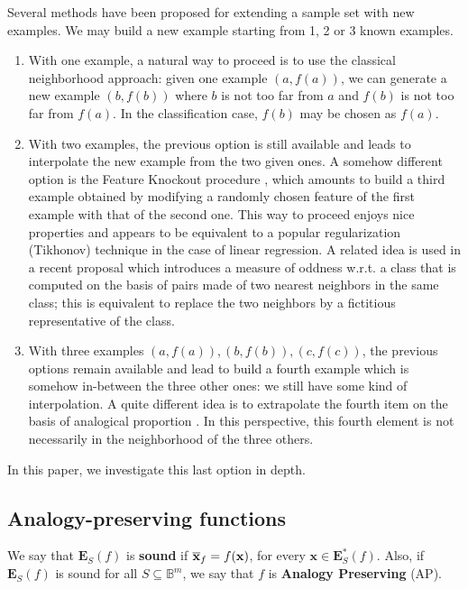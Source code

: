 Several methods have been proposed for extending a sample set with new
examples. We may build a new example starting from
1, 2 or 3 known examples.
\begin{enumerate}
\item With one example, a natural way to proceed is to use the classical
  neighborhood approach: given one  example $(a,f(a))$, we can generate a new
    example $(b,f(b))$ where  $b$ is not too far from $a$ and $f(b)$ is not too
    far from $f(a)$. In the classification case, $f(b)$ may be chosen as
    $f(a)$.
\item With two examples, the previous option is still available and leads to
  interpolate the new example from the two given ones.  A somehow different
    option is the Feature Knockout procedure \cite{WolMar2004}, which amounts
    to build a third example obtained by modifying a randomly chosen feature
    of the first example with that of the second one.  This way to
    proceed enjoys nice properties and appears to be equivalent to a popular
    regularization (Tikhonov) technique in the case of linear regression.  A
    related idea is used in a recent proposal \cite{BouPraRicECAI2016} which
    introduces a measure of oddness w.r.t. a class that is computed on the
    basis of pairs made of two nearest neighbors in the same class; this is
    equivalent to replace the two neighbors by a fictitious representative of
    the class.

\item With three examples $(a,f(a)), (b,f(b)), (c,f(c))$, the previous options
  remain available and lead to build a fourth example which is somehow
    in-between the three other ones: we still have some kind of interpolation.
    A quite different idea is to extrapolate the fourth item on the basis of
    analogical proportion \cite{BayMouMicAnqECML2007}.  In this perspective,
    this fourth element is not necessarily in the neighborhood of the three
    others.
\end{enumerate}
In this paper, we investigate this last option in depth.

\subsection{Analogy-preserving functions}\label{analogy-preserv}

\begin{definition}
  We say that $\mathbf{E}_S(f)$ is {\bf sound} if
  $\overline{\mathbf{x}}_f=f(\mathbf{x})$, for every $\mathbf{x} \in
  \mathbf{E}^*_S(f)$. Also, if $\mathbf{E}_S(f)$ is sound for all $S \subseteq
  \mathbb{B}^m$, we say that $f$ is {\bf Analogy Preserving} (AP).
\end{definition}

